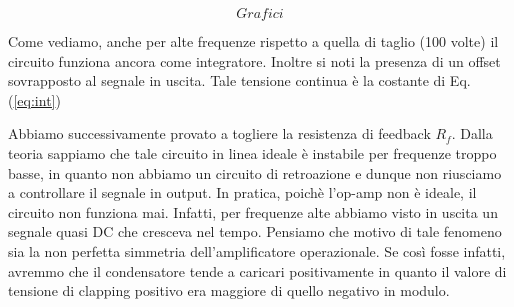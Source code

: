 $$Grafici$$



Come vediamo, anche per alte frequenze rispetto a quella di taglio (100 volte) il circuito funziona ancora come integratore. 
Inoltre si noti la presenza di un offset sovrapposto al segnale in uscita. Tale tensione continua è la costante di Eq.(\ref{eq:int})



Abbiamo successivamente provato a togliere la resistenza di feedback $R_f$. Dalla teoria sappiamo che tale circuito in linea ideale è instabile per frequenze troppo basse, in quanto non abbiamo un circuito di retroazione e dunque non riusciamo a controllare il segnale in output. In pratica, poichè l'op-amp non è ideale, il circuito non funziona mai. Infatti, per frequenze alte abbiamo visto in uscita un segnale quasi DC che cresceva nel tempo. Pensiamo che motivo di tale fenomeno sia la non perfetta simmetria dell'amplificatore operazionale. Se così fosse infatti, avremmo che il condensatore tende a caricari positivamente in quanto il valore di tensione di clapping positivo era maggiore di quello negativo in modulo. 